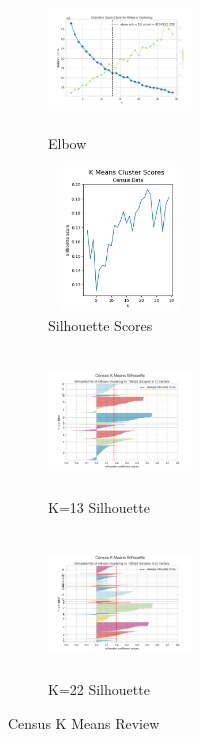 \documentclass[letterpaper]{article} %
\begin{document}
\begin{figure}[!htb]
	\centering
		\begin{subfigure} [b]{.25\textwidth}
			\centering
			\includegraphics[width=1.5in, height=1.5in]{figures/Census_elbow_max_30_best_13.png}
			\caption{Elbow}
			\label{fig:kmeans_census_elbow}
		\end{subfigure}%
		\begin{subfigure}[b]  {.25\textwidth}
			\includegraphics[width=1.5in, height=1.5in]{figures/K_Means_Cluster_Scores_Census_Data.png}
			\caption{Silhouette Scores}
			\label{fig:kmeans_census_silhouette}
		\end{subfigure}
		\newline
		\begin{subfigure} [b]{.25\textwidth}
			\centering
			\includegraphics[width=1.5in, height=1.5in]{figures/Census_silhouette_K_13.png}
			\caption{K=13 Silhouette}
			\label{fig:kmeans_census_silhouette_13}
		\end{subfigure}%
		\begin{subfigure}[b]  {.25\textwidth}
			\includegraphics[width=1.5in, height=1.5in]{figures/Census_silhouette_K_22.png}
			\caption{K=22 Silhouette}
			\label{fig:kmeans_census_silhouette_22}
		\end{subfigure}		
		\caption{Census K Means Review}
		\label{fig:kmeans_census_cluster}
\end{figure}
\end{document}
